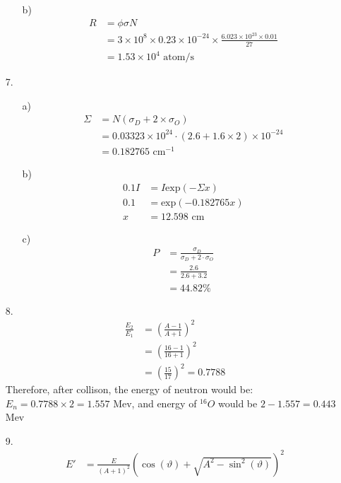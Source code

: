 \documentclass{article}
\begin{document}
\begin{itemize}
\begin{itemize}
        \item [b)]
        \begin{align*}
            R&=\phi \sigma N\\
            &=3\times 10^8\times 0.23\times 10^{-24}\times\frac{6.023\times 10^{23}\times 0.01}{27}\\
            &=1.53\times 10^4 \text{ atom/s}
        \end{align*}
        \end{itemize}
    \item [7.]
    \begin{itemize}
        \item [a)]
        \begin{align*}
            \Sigma &= N(\sigma_D+2\times \sigma_O)\\
                    &=0.03323\times 10^{24}\cdot(2.6+1.6\times2)\times 10^{-24}\\
                    &=0.182765 \text{ cm}^{-1}
        \end{align*}
        \item [b)]
        \begin{align*}
            0.1I&=I\text{exp}(-\Sigma x)\\
            0.1&=\text{exp}(-0.182765x)\\
            x&= 12.598 \text{ cm}
        \end{align*}
        \item [c)]
        \begin{align*}
            P &= \frac{\sigma_D}{\sigma_D+2\cdot\sigma_O}\\
            &=\frac{2.6}{2.6+3.2}\\
            &=44.82\%
        \end{align*}
    \end{itemize}
    \item [8.]
    \begin{align*}
        \frac{E_2}{E_1} &= \left(\frac{A-1}{A+1}\right)^2\\
        &=\left(\frac{16-1}{16+1}\right)^2\\
        &=\left(\frac{15}{17}\right)^2 = 0.7788
    \end{align*}
    Therefore, after collison, the energy of neutron would be:\(E_n = 0.7788\times 2 = 1.557\) Mev, and energy of \(^16O\) would be \(2-1.557 = 0.443\) Mev
    \item [9.]
    \begin{align*}
        E' &= \frac{E}{(A+1)^2}\left(\cos (\vartheta)+\sqrt{A^2-\sin^2(\vartheta)}\right)^2\\

\end{align*}
\end{itemize}
\end{document}
